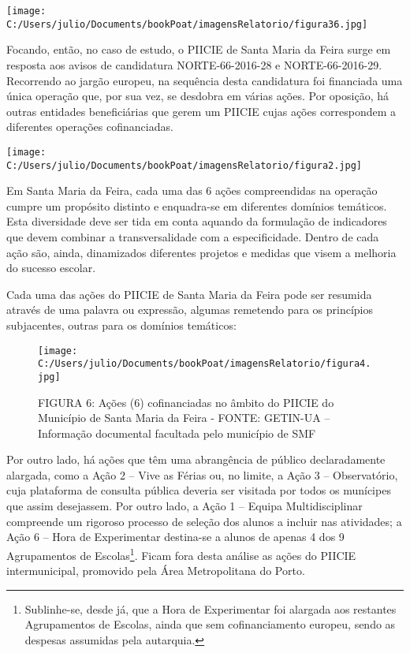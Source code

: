 \documentclass[
]{book}
\begin{document}
\texttt{[image: C:/Users/julio/Documents/bookPoat/imagensRelatorio/figura36.jpg]}

Focando, então, no caso de estudo, o PIICIE de Santa Maria da Feira surge em resposta aos avisos de candidatura NORTE-66-2016-28 e NORTE-66-2016-29. Recorrendo ao jargão europeu, na sequência desta candidatura foi financiada uma única operação que, por sua vez, se desdobra em várias ações. Por oposição, há outras entidades beneficiárias que gerem um PIICIE cujas ações correspondem a diferentes operações cofinanciadas.

\texttt{[image: C:/Users/julio/Documents/bookPoat/imagensRelatorio/figura2.jpg]}

Em Santa Maria da Feira, cada uma das 6 ações compreendidas na operação cumpre um propósito distinto e enquadra-se em diferentes domínios temáticos. Esta diversidade deve ser tida em conta aquando da formulação de indicadores que devem combinar a transversalidade com a especificidade. Dentro de cada ação são, ainda, dinamizados diferentes projetos e medidas que visem a melhoria do sucesso escolar.

Cada uma das ações do PIICIE de Santa Maria da Feira pode ser resumida através de uma palavra ou expressão, algumas remetendo para os princípios subjacentes, outras para os domínios temáticos:

\begin{figure}
\centering
\texttt{[image: C:/Users/julio/Documents/bookPoat/imagensRelatorio/figura4.jpg]}
\caption{FIGURA 6: Ações (6) cofinanciadas no âmbito do PIICIE do Município de Santa Maria da Feira - FONTE: GETIN-UA -- Informação documental facultada pelo município de SMF}
\end{figure}

Por outro lado, há ações que têm uma abrangência de público declaradamente alargada, como a Ação 2 -- Vive as Férias ou, no limite, a Ação 3 -- Observatório, cuja plataforma de consulta pública deveria ser visitada por todos os munícipes que assim desejassem. Por outro lado, a Ação 1 -- Equipa Multidisciplinar compreende um rigoroso processo de seleção dos alunos a incluir nas atividades; a Ação 6 -- Hora de Experimentar destina-se a alunos de apenas 4 dos 9 Agrupamentos de Escolas\footnote{Sublinhe-se, desde já, que a Hora de Experimentar foi alargada aos restantes Agrupamentos de Escolas, ainda que sem cofinanciamento europeu, sendo as despesas assumidas pela autarquia.}. Ficam fora desta análise as ações do PIICIE intermunicipal, promovido pela Área Metropolitana do Porto.
\end{document}
